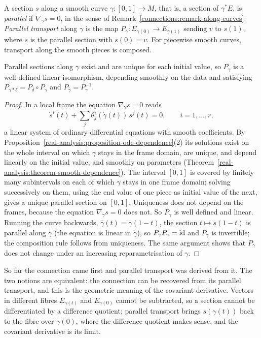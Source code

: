 \begin{definition}\label{connections:definition-parallel}
A section $s$ along a smooth curve $\gamma \colon [0, 1] \to M$, that is, a section of $\gamma^*E$, is \emph{parallel} if $\nabla_{\dot\gamma}s = 0$, in the sense of
Remark~\ref{connections:remark-along-curves}. \emph{Parallel transport} along $\gamma$ is the map $P_\gamma \colon E_{\gamma(0)} \to E_{\gamma(1)}$
sending $v$ to $s(1)$, where $s$ is the parallel section with $s(0) = v$. For piecewise smooth curves, transport along the smooth pieces is composed.
\end{definition}

\begin{proposition}\label{connections:proposition-parallel-transport}
Parallel sections along $\gamma$ exist and are unique for each initial value, so $P_\gamma$ is a well-defined linear isomorphism, depending smoothly on the data and satisfying
$P_{\gamma \ast \delta} = P_\delta \circ P_\gamma$ and $P_{\bar\gamma} = P_\gamma^{-1}$.
\end{proposition}

\begin{proof}
In a local frame the equation $\nabla_{\dot\gamma}s = 0$ reads
\[
\dot s^i(t) + \sum_j\theta^i_j(\dot\gamma(t))\,s^j(t) = 0, \qquad i = 1, \ldots, r,
\]
a linear system of ordinary differential equations with smooth coefficients. By Proposition~\ref{real-analysis:proposition-ode-dependence}(2) its solutions exist on the whole
interval on which $\gamma$ stays in the frame domain, are unique, and depend linearly on the initial value, and smoothly on parameters
(Theorem~\ref{real-analysis:theorem-smooth-dependence}). The interval $[0, 1]$ is covered by finitely many subintervals on each of which $\gamma$ stays in one frame domain; solving
successively on them, using the end value of one piece as initial value of the next, gives a unique parallel section on $[0, 1]$. Uniqueness does not depend on the frames,
because the equation $\nabla_{\dot\gamma}s = 0$ does not. So $P_\gamma$ is well defined and linear. Running the curve backwards, $\bar\gamma(t) = \gamma(1 - t)$, the section
$t \mapsto s(1 - t)$ is parallel along $\bar\gamma$ (the equation is linear in $\dot\gamma$), so $P_{\bar\gamma}P_\gamma = \mathrm{id}$ and $P_\gamma$ is invertible; the composition rule follows
from uniqueness. The same argument shows that $P_\gamma$ does not change under an increasing reparametrisation of $\gamma$.
\end{proof}

So far the connection came first and parallel transport was derived from it. The two notions are equivalent: the connection can be recovered from its parallel transport, and this is the
geometric meaning of the covariant derivative. Vectors in different fibres $E_{\gamma(t)}$ and $E_{\gamma(0)}$ cannot be subtracted, so a section cannot be differentiated by a difference quotient; parallel
transport brings $s(\gamma(t))$ back to the fibre over $\gamma(0)$, where the difference quotient makes sense, and the covariant derivative is its limit.

